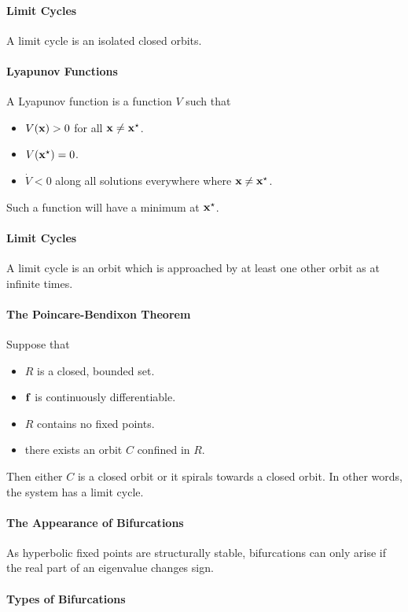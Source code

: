 \paragraph{Limit Cycles}
A limit cycle is an isolated closed orbits.

\paragraph{Lyapunov Functions}
A Lyapunov function is a function $V$ such that
\begin{itemize}
	\item $V(\vb{x}) > 0$ for all $\vb{x} \neq \vb{x}^{\star}$.
	\item $V(\vb{x}^{\star}) = 0$.
	\item $\dot{V} < 0$ along all solutions everywhere where $\vb{x} \neq \vb{x}^{\star}$.
\end{itemize}
Such a function will have a minimum at $\vb{x}^{\star}$.

\paragraph{Limit Cycles}
A limit cycle is an orbit which is approached by at least one other orbit as at infinite times.

\paragraph{The Poincare-Bendixon Theorem}
Suppose that
\begin{itemize}
	\item $R$ is a closed, bounded set.
	\item $\vb{f}$ is continuously differentiable.
	\item $R$ contains no fixed points.
	\item there exists an orbit $C$ confined in $R$.
\end{itemize}
Then either $C$ is a closed orbit or it spirals towards a closed orbit. In other words, the system has a limit cycle.

\paragraph{The Appearance of Bifurcations}
As hyperbolic fixed points are structurally stable, bifurcations can only arise if the real part of an eigenvalue changes sign.

\paragraph{Types of Bifurcations}

